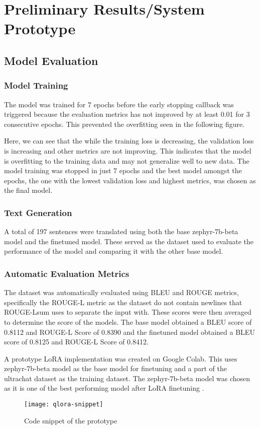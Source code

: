 \chapter{Preliminary Results/System Prototype}

\section{Model Evaluation}
\subsection{Model Training}
The model was trained for 7 epochs before the early stopping callback was triggered because the evaluation metrics has not improved by at least 0.01 for 3 consecutive epochs. This prevented the overfitting seen in the following figure. 

Here, we can see that the while the training loss is decreasing, the validation loss is increasing and other metrics are not improving. This indicates that the model is overfitting to the training data and may not generalize well to new data. The model training was stopped in just 7 epochs and the best model amongst the epochs, the one with the lowest validation loss and highest metrics, was chosen as the final model.

\subsection{Text Generation}
A total of 197 sentences were translated using both the base zephyr-7b-beta model and the finetuned model. These served as the dataset used to evaluate the performance of the model and comparing it with the other base model.
\subsection{Automatic Evaluation Metrics}
The dataset was automatically evaluated using BLEU and ROUGE metrics, specifically the ROUGE-L metric as the dataset do not contain newlines that ROUGE-Lsum uses to separate the input with. These scores were then averaged to determine the score of the models. The base model obtained a BLEU score of 0.8112 and ROUGE-L Score of 0.8390 and the finetuned model obtained a BLEU score of 0.8125 and ROUGE-L Score of 0.8412.


A prototype LoRA implementation was created on Google Colab. 
This uses zephyr-7b-beta model as the base model for finetuning and a part of the ultrachat dataset as the training dataset.
The zephyr-7b-beta model was chosen as it is one of the best performing model after LoRA finetuning \cite{zhao2024loraland310finetuned}.
\begin{figure}
    \caption{Code snippet of the prototype}
    \centering
    \texttt{[image: qlora-snippet]}
\end{figure}

